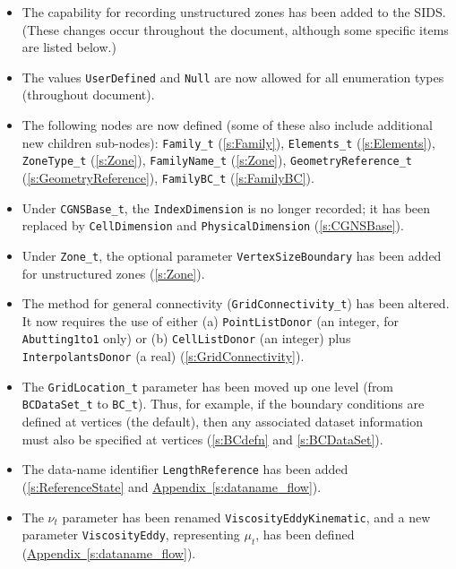 \begin{itemize}
\item The capability for recording unstructured zones has been
      added to the SIDS.
      (These changes occur throughout the document, although some
      specific items are listed below.)
\item The values \texttt{UserDefined} and \texttt{Null} are now allowed for
      all enumeration types (throughout document).
\item The following nodes are now defined (some of these also
      include additional new children sub-nodes): \texttt{Family\_t}
      (\autoref{s:Family}), \texttt{Elements\_t} (\autoref{s:Elements}),
      \texttt{ZoneType\_t} (\autoref{s:Zone}), \texttt{FamilyName\_t}
      (\autoref{s:Zone}), \texttt{GeometryReference\_t}
      (\autoref{s:GeometryReference}), \texttt{FamilyBC\_t}
      (\autoref{s:FamilyBC}).
\item Under \texttt{CGNSBase\_t}, the \texttt{IndexDimension} is no longer
      recorded; it has been replaced by \texttt{CellDimension} and
      \texttt{PhysicalDimension} (\autoref{s:CGNSBase}).
\item Under \texttt{Zone\_t}, the optional parameter
      \texttt{VertexSizeBoundary} has been added for unstructured zones
      (\autoref{s:Zone}).
\item The method for general connectivity (\texttt{GridConnectivity\_t})
      has been altered.
      It now requires the use of either (a) \texttt{PointListDonor} (an
      integer, for \texttt{Abutting1to1} only) or (b) \texttt{CellListDonor}
      (an integer) plus \texttt{InterpolantsDonor} (a real)
      (\autoref{s:GridConnectivity}).
\item The \texttt{GridLocation\_t} parameter has been moved up one level
      (from \texttt{BCDataSet\_t} to \texttt{BC\_t}).
      Thus, for example, if the boundary conditions are defined at
      vertices (the default), then any associated dataset information
      must also be specified at vertices (\autoref{s:BCdefn} and
      \autoref{s:BCDataSet}).
\item The data-name identifier \texttt{LengthReference}
      has been added (\autoref{s:ReferenceState} and
      \hyperref[s:dataname_flow]{Appendix~\ref*{s:dataname_flow}}).
\item The $\nu_t$ parameter has been renamed
      \texttt{ViscosityEddyKinematic}, and a new parameter
      \texttt{ViscosityEddy}, representing $\mu_t$, has been defined
      (\hyperref[s:dataname_flow]{Appendix~\ref*{s:dataname_flow}}).
\end{itemize}
